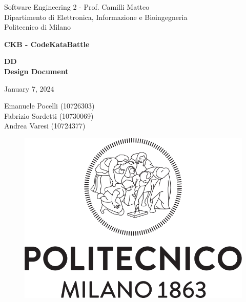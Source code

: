 \documentclass{article}
\begin{document}
\begin{titlepage}
  \centering
  {\normalsize
    Software Engineering 2 - Prof. Camilli Matteo \\
    Dipartimento di Elettronica, Informazione e Bioingegneria \\
    Politecnico di Milano \par
  }     \vspace{3cm}
  {\Huge \textbf{CKB - CodeKataBattle\\} } \vspace{1cm}
  {\large \textbf{DD\\Design Document} \par} \vspace{1cm}
  {\normalsize January 7, 2024 \par} \vspace{4cm}
  {\normalsize Emanuele Pocelli (10726303) \\ Fabrizio Sordetti (10730069) \\  Andrea Varesi (10724377)\par} \vspace{4cm}
  \begin{figure}[h]
    \centering
    \includegraphics[scale=0.3]{src/poli_logo.png}
  \end{figure} \vspace{0.5cm}
\end{titlepage}

\begin{large}
    
\tableofcontents









\end{large}
\end{document}
